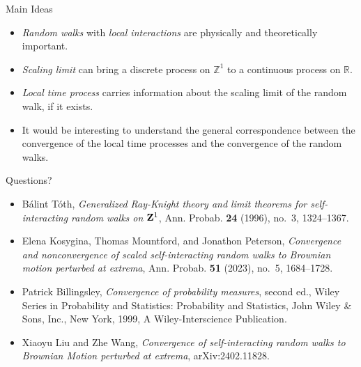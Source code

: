 \documentclass{if-beamer}
\begin{document}
\begin{frame}{Main Ideas}
    \begin{itemize}
        \item \emph{Random walks} with \emph{local interactions} are physically and theoretically important.
        \item \emph{Scaling limit} can bring a discrete process on $\mathbb{Z}^1$ to a continuous process on $\mathbb{R}$.
        \item \emph{Local time process} carries information about the scaling limit of the random walk, if it exists.
        \item It would be interesting to understand the general correspondence between the convergence of the local time processes and the convergence of the random walks.
    \end{itemize}
\end{frame}

\begin{frame}
    \begin{center}
        \Huge Questions?
    \end{center}
\vfill
    
\begin{itemize}
\item
    B\'{a}lint T\'{o}th, \emph{Generalized {R}ay-{K}night theory and limit theorems for self-interacting random walks on {${\bf Z}^1$}}, Ann. Probab. \textbf{24} (1996), no.~3, 1324--1367. 

    \item
    Elena Kosygina, Thomas Mountford, and Jonathon Peterson,  \emph{Convergence and nonconvergence of scaled self-interacting random walks to {B}rownian motion perturbed at extrema}, Ann. Probab. \textbf{51} (2023), no.~5, 1684--1728. 

    \item
    Patrick Billingsley, \emph{Convergence of probability measures}, second ed., Wiley Series in Probability and Statistics: Probability and Statistics, John Wiley \& Sons, Inc., New York, 1999, A Wiley-Interscience Publication. 

    \item
    Xiaoyu Liu and Zhe Wang, \emph{Convergence of self-interacting random walks to Brownian Motion perturbed at extrema}, arXiv:2402.11828.

    \end{itemize}
\end{frame}
\end{document}
